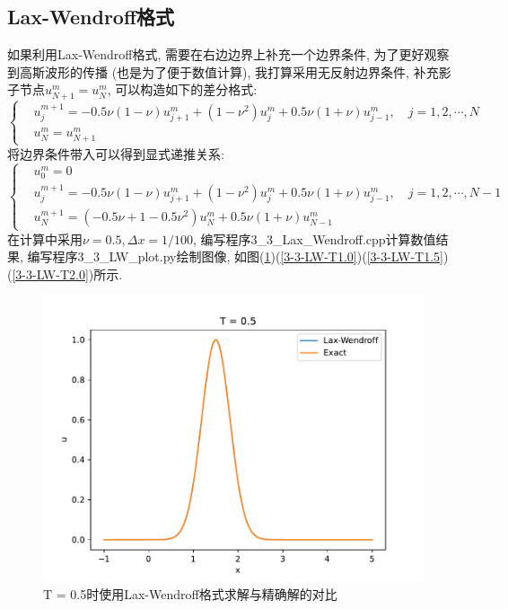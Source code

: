 \documentclass[a4paper,zihao=5,UTF8]{ctexart}
\begin{document}
	\subsection{Lax-Wendroff格式}
	如果利用Lax-Wendroff格式, 需要在右边边界上补充一个边界条件, 为了更好观察到高斯波形的传播
	(也是为了便于数值计算), 我打算采用无反射边界条件, 补充影子节点$u_{N+1}^m = u_N^m$, 
	可以构造如下的差分格式:
	\begin{equation}
		\left\{
			\begin{aligned}
				&u_j^{m+1} = -0.5 \nu(1-\nu)u_{j+1}^m + (1 - \nu^2)u_j^{m} + 0.5 \nu(1+\nu)u_{j-1}^m, \quad j = 1, 2, \cdots, N\\
				&u_{N}^m = u_{N+1}^m
			\end{aligned}
		\right.
	\end{equation}
	将边界条件带入可以得到显式递推关系:
	\begin{equation}
		\left\{
			\begin{aligned}
				& u_0^m = 0\\
				& u_j^{m+1} = -0.5 \nu(1-\nu)u_{j+1}^m + (1 - \nu^2)u_j^{m} + 0.5 \nu(1+\nu)u_{j-1}^m, \quad j = 1, 2, \cdots, N - 1\\
				& u_{N}^{m+1} = (-0.5 \nu + 1 - 0.5\nu^2)u_{N}^m + 0.5\nu(1+\nu)u_{N-1}^m
			\end{aligned}
		\right.
	\end{equation}
	在计算中采用$\nu = 0.5, \Delta x = 1/100$, 编写程序3\_3\_Lax\_Wendroff.cpp计算数值结果, 
	编写程序3\_3\_LW\_plot.py绘制图像, 如图(\ref{3-3-LW-T0.5})(\ref{3-3-LW-T1.0})(\ref{3-3-LW-T1.5})(\ref{3-3-LW-T2.0})所示.
	\begin{figure}[htbp]
		\centering
		\includegraphics[scale=0.7]{3_3_LW_0_5.pdf}
		\caption{T = 0.5时使用Lax-Wendroff格式求解与精确解的对比}
		\label{3-3-LW-T0.5}
	\end{figure}
\end{document}
